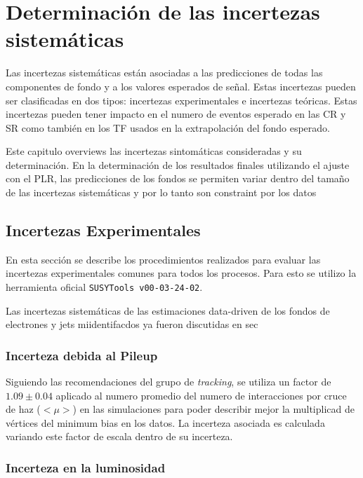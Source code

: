 \chapter{Determinación de las incertezas sistemáticas}

Las incertezas sistemáticas están asociadas a las predicciones de todas
las componentes de fondo y a los valores esperados de señal. Estas
incertezas pueden ser clasificadas en dos tipos: incertezas experimentales
e incertezas teóricas. Estas incertezas pueden tener impacto en el numero
de eventos esperado en las CR y SR como también en los TF usados
en la extrapolación del fondo esperado.

Este capitulo overviews las incertezas sintomáticas consideradas y su determinación.
En la determinación de los resultados finales utilizando el ajuste con el PLR,
las predicciones de los fondos se permiten variar dentro del tamaño de las
incertezas sistemáticas y por lo tanto son constraint por los datos


\section{Incertezas Experimentales}\label{sec:expsyst}

En esta sección se describe los procedimientos realizados para evaluar
las incertezas experimentales comunes para todos los procesos. Para esto
se utilizo la herramienta oficial \texttt{SUSYTools v00-03-24-02}.

Las incertezas sistemáticas de las estimaciones data-driven
de los fondos de electrones y jets miidentifacdos ya fueron discutidas
en sec \XXX


\subsection{Incerteza debida al Pileup}

Siguiendo las recomendaciones del grupo de \emph{tracking}, se utiliza
un factor de $1.09 \pm 0.04$ aplicado al numero promedio del numero de
interacciones por cruce de haz ($<\mu>$) en las simulaciones para poder
describir mejor la multiplicad de vértices del minimum bias en los datos.
La incerteza asociada es calculada variando este factor de escala dentro
de su incerteza.

\subsection{Incerteza en la luminosidad}

